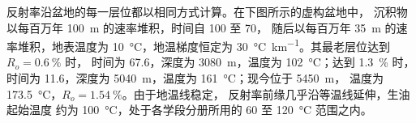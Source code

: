 反射率沿盆地的每一层位都以相同方式计算。在下图所示的虚构盆地中，
沉积物以每百万年 \qty{100}{m} 的速率堆积，时间自 100 至 \qty{70}{\Ma}，
随后以每百万年 \qty{35}{m} 的速率堆积，地表温度为 \qty{10}{\celsius}，地温梯度恒定为
\qty{30}{\celsius\per\km}。其最老层位达到 $R_o = \qty{0.6}{\percent}$ 时，
时间为 \qty{67.6}{\Ma}，深度为 \qty{3080}{m}，温度为 \qty{102}{\celsius}；达到 \qty{1.3}{\percent} 时，
时间为 \qty{11.6}{\Ma}，深度为 \qty{5040}{m}，温度为 \qty{161}{\celsius}；现今位于 \qty{5450}{m}，
温度为 \qty{173.5}{\celsius}，$R_o = \qty{1.54}{\percent}$。由于地温线稳定，
反射率前缘几乎沿等温线延伸，生油起始温度
约为 \qty{100}{\celsius}，处于各学段分册所用的 60 至 \qty{120}{\celsius} 范围之内。

